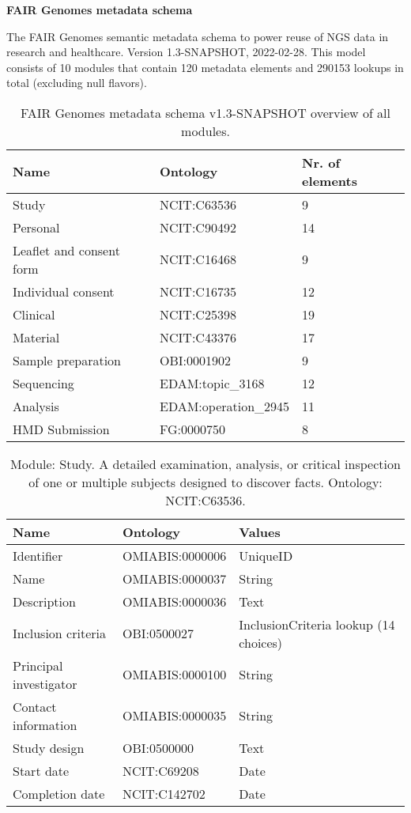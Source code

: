 \documentclass{article}
\begin{document}
\setlength\parindent{0pt}

\textbf{FAIR Genomes metadata schema}
\newline

The FAIR Genomes semantic metadata schema to power reuse of NGS data in research and healthcare. Version 1.3-SNAPSHOT, 2022-02-28. This model consists of 10 modules that contain 120 metadata elements and 290153 lookups in total (excluding null flavors).

\begin{table}[htb]
\begin{tabular}{lll}
Name & Ontology & Nr. of elements \\
\hline
Study & NCIT:C63536 & 9 \\
Personal & NCIT:C90492 & 14 \\
Leaflet and consent form & NCIT:C16468 & 9 \\
Individual consent & NCIT:C16735 & 12 \\
Clinical & NCIT:C25398 & 19 \\
Material & NCIT:C43376 & 17 \\
Sample preparation & OBI:0001902 & 9 \\
Sequencing & EDAM:topic\_3168 & 12 \\
Analysis & EDAM:operation\_2945 & 11 \\
HMD Submission & FG:0000750 & 8 \\
\hline
\end{tabular}
\caption[Module overview]{\label{table:table1} FAIR Genomes metadata schema v1.3-SNAPSHOT overview of all modules.}
\end{table}

\begin{table}[htb]
\begin{tabular}{lll}
Name & Ontology & Values \\
\hline
Identifier & OMIABIS:0000006 & UniqueID \\
Name & OMIABIS:0000037 & String \\
Description & OMIABIS:0000036 & Text \\
Inclusion criteria & OBI:0500027 & InclusionCriteria lookup (14 choices) \\
Principal investigator & OMIABIS:0000100 & String \\
Contact information & OMIABIS:0000035 & String \\
Study design & OBI:0500000 & Text \\
Start date & NCIT:C69208 & Date \\
Completion date & NCIT:C142702 & Date \\
\hline
\end{tabular}
\caption[Module: Study]{\label{table:table2} Module: Study. A detailed examination, analysis, or critical inspection of one or multiple subjects designed to discover facts. Ontology: NCIT:C63536. }
\end{table}
\end{document}
